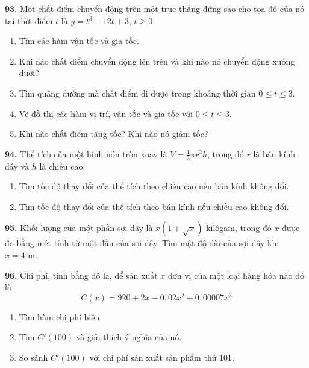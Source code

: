 
\noindent
\begin{minipage}[t]{0.485\textwidth}
\textbf{93.} Một chất điểm chuyển động trên một trục thẳng đứng sao cho tọa độ của nó tại thời điểm $t$ là $y = t^3 - 12t + 3$, $t \ge 0$.
\begin{enumerate}[label=(\alph*), leftmargin=1.8em, itemsep=1.5pt, topsep=2pt]
    \item Tìm các hàm vận tốc và gia tốc.
    \item Khi nào chất điểm chuyển động lên trên và khi nào nó chuyển động xuống dưới?
    \item Tìm quãng đường mà chất điểm đi được trong khoảng thời gian $0 \le t \le 3$.
    \item[{\makebox[0pt][r]{\graphingicon\hspace{3pt}}(d)}] Vẽ đồ thị các hàm vị trí, vận tốc và gia tốc với $0 \le t \le 3$.
    \item Khi nào chất điểm tăng tốc? Khi nào nó giảm tốc?
\end{enumerate}

\medskip
\textbf{94.} Thể tích của một hình nón tròn xoay là $V = \frac{1}{3}\pi r^2 h$, trong đó $r$ là bán kính đáy và $h$ là chiều cao.
\begin{enumerate}[label=(\alph*), leftmargin=1.8em, itemsep=1.5pt, topsep=2pt]
    \item Tìm tốc độ thay đổi của thể tích theo chiều cao nếu bán kính không đổi.
    \item Tìm tốc độ thay đổi của thể tích theo bán kính nếu chiều cao không đổi.
\end{enumerate}

\medskip
\textbf{95.} Khối lượng của một phần sợi dây là $x(1 + \sqrt{x})$ kilôgam, trong đó $x$ được đo bằng mét tính từ một đầu của sợi dây. Tìm mật độ dài của sợi dây khi $x = 4\text{ m}$.

\medskip
\textbf{96.} Chi phí, tính bằng đô la, để sản xuất $x$ đơn vị của một loại hàng hóa nào đó là
\[ C(x) = 920 + 2x - 0{,}02x^2 + 0{,}00007x^3 \]
\begin{enumerate}[label=(\alph*), leftmargin=1.8em, itemsep=1.5pt, topsep=2pt]
    \item Tìm hàm chi phí biên.
    \item Tìm $C'(100)$ và giải thích ý nghĩa của nó.
    \item So sánh $C'(100)$ với chi phí sản xuất sản phẩm thứ 101.
\end{enumerate}


\end{minipage}
